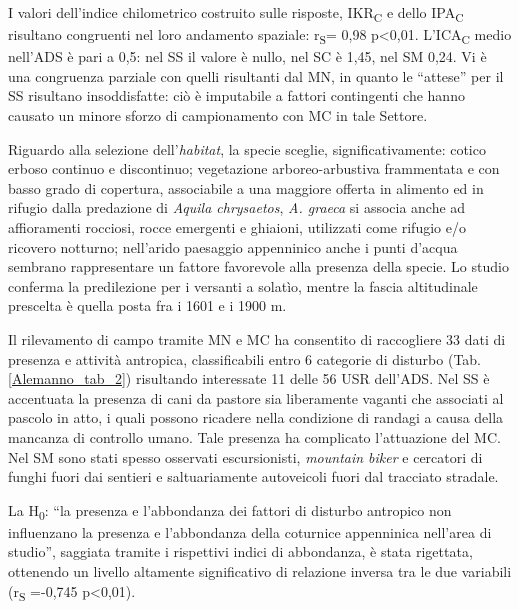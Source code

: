 I valori dell{\textquoteright}indice chilometrico costruito sulle
risposte, IKR\textsubscript{C}  e dello IPA\textsubscript{C} risultano
congruenti nel loro andamento spaziale: r\textsubscript{S}= 0,98
p{\textless}0,01. L{\textquoteright}ICA\textsubscript{C} medio
nell{\textquoteright}ADS \`e pari a 0,5: nel SS il valore \`e nullo,
nel SC \`e 1,45, nel SM 0,24. Vi \`e una congruenza parziale con quelli
risultanti dal MN, in quanto le
{\textquotedblleft}attese{\textquotedblright} per il SS risultano
insoddisfatte: ci\`o \`e imputabile a fattori contingenti che hanno
causato un minore sforzo di campionamento con MC in tale Settore. 

Riguardo alla selezione dell{\textquoteright}\textit{habitat}, la specie
sceglie, significativamente: cotico erboso continuo e discontinuo;
vegetazione arboreo-arbustiva frammentata e con basso grado di
copertura, associabile a una maggiore offerta in alimento ed in rifugio
dalla predazione di \textit{Aquila chrysaetos},  \textit{A. graeca} si
associa anche ad affioramenti rocciosi, rocce emergenti e ghiaioni,
utilizzati come rifugio e/o ricovero notturno;
nell{\textquoteright}arido paesaggio appenninico anche i punti
d{\textquoteright}acqua sembrano rappresentare un fattore favorevole
alla presenza della specie. Lo studio conferma la predilezione per i
versanti a solat\`io, mentre la fascia altitudinale prescelta \`e
quella posta fra i 1601 e i 1900 m.

Il rilevamento di campo tramite MN e MC ha consentito di raccogliere 33
dati di presenza e attivit\`a antropica, classificabili entro 6
categorie di disturbo (Tab. \ref{Alemanno_tab_2}) risultando interessate 11 delle 56 USR
dell{\textquoteright}ADS. Nel SS \`e accentuata la presenza di cani da
pastore sia liberamente vaganti che associati al pascolo in atto, i
quali possono ricadere nella condizione di randagi a causa della
mancanza di controllo umano. Tale presenza ha complicato
l{\textquoteright}attuazione del MC. Nel SM sono stati spesso osservati
escursionisti, \textit{mountain biker} e cercatori di funghi fuori dai
sentieri e saltuariamente autoveicoli fuori dal tracciato stradale.

La H\textsubscript{0}: {\textquotedblleft}la presenza e
l{\textquoteright}abbondanza dei fattori di disturbo antropico non
influenzano la presenza e l{\textquoteright}abbondanza della coturnice
appenninica nell{\textquoteright}area di studio{\textquotedblright},
saggiata tramite i rispettivi indici di abbondanza, \`e stata
rigettata, ottenendo un livello altamente significativo di relazione
inversa tra le due variabili (r\textsubscript{S }=-0,745
p{\textless}0,01).


